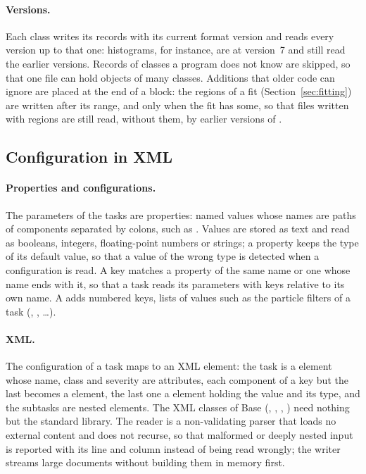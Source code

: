 \paragraph{Versions.}
Each class writes its records with its current format version and reads every version up to that one: histograms,
for instance, are at version~7 and still read the earlier versions. Records of classes a program does not know are
skipped, so that one file can hold objects of many classes. Additions that older code can ignore are placed at the end
of a block: the regions of a fit (Section~\ref{sec:fitting}) are written after its range, and only when the fit has
some, so that files written with regions are still read, without them, by earlier versions of \Datum{}.

\subsection{Configuration in XML}
\label{sec:xml}

\paragraph{Properties and configurations.}
The parameters of the tasks are properties: named values whose names are paths of components separated by colons,
such as . Values are stored as text and read as booleans, integers, floating-point
numbers or strings; a property keeps the type of its default value, so that a value of the wrong type is detected when
a configuration is read. A key matches a property of the same name or one whose name ends with it, so that a task reads
its parameters with keys relative to its own name. A  adds numbered keys, lists of values such as
the particle filters of a task (, , \dots).

\paragraph{XML.}
The configuration of a task maps to an XML element: the task is a  element whose name, class and severity
are attributes, each component of a key but the last becomes a  element, the last one a 
element holding the value and its type, and the subtasks are nested  elements. The XML classes of Base
(, , , ) need nothing but the standard library. The
reader is a non-validating parser that loads no external content and does not recurse, so that malformed or deeply
nested input is reported with its line and column instead of being read wrongly; the writer streams large documents
without building them in memory first.

